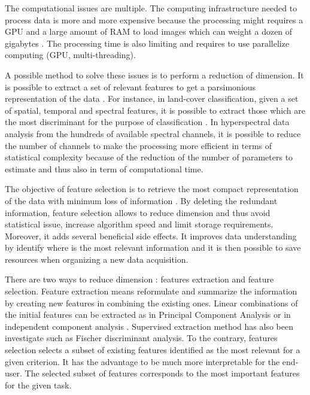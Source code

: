 \documentclass[journal,peerreview,onecolumn]{IEEEtran}
\begin{document}
The computational issues are multiple. The computing infrastructure needed to process data is more and more expensive because the processing might requires a GPU and a large amount of RAM to load images which can weight a dozen of gigabytes \cite{christophe2011remote}\cite{plaza2011high}. The processing time is also limiting and requires to use parallelize computing (GPU, multi-threading).

A possible method to solve these issues is to perform a reduction of dimension. It is possible to extract a set of relevant features to get a parsimonious representation of the data \cite{jimenez1998supervised}. For instance, in land-cover classification, given a set of spatial, temporal and spectral features, it is possible to extract those which are the most discriminant for the purpose of classification \cite{fassnacht2014comparison}. In hyperspectral data analysis from the hundreds of available spectral channels, it is possible to reduce the number of channels to make the processing more efficient in terms of statistical complexity because of the reduction of the number of parameters to estimate and thus also in term of computational time.

The objective of feature selection is to retrieve the most compact representation of the data with minimum loss of information \cite{Guyon:2006:FEF:1208773}. By deleting the redundant information, feature selection allows to reduce dimension and thus avoid statistical issue, increase algorithm speed and limit storage requirements. Moreover, it adds several beneficial side effects. It improves data understanding by identify where is the most relevant information and it is then possible to save resources when organizing a new data acquisition.

There are two ways to reduce dimension \cite{Guyon:2006:FEF:1208773}: features extraction and feature selection. Feature extraction means reformulate and summarize the information by creating new features in combining the existing ones. Linear combinations of the initial features can be extracted as in Principal Component Analysis \cite{jimenez1998supervised} or in independent component analysis \cite{villa2011hyperspectral}. Supervised extraction method has also been investigate such as Fischer discriminant analysis. To the contrary, features selection selects a subset of existing features identified as the most relevant for a given criterion. It has the advantage to be much more interpretable for the end-user. The selected subset of features corresponds to the most important features for the given task.
\end{document}
